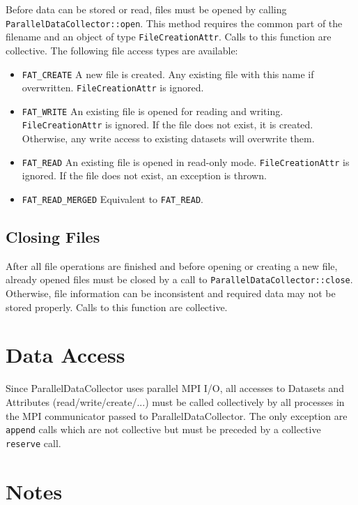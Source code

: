\documentclass[a4paper,10pt,BCOR12mm]{report}
\newcommand{\code}[1]{\small \texttt{#1}}
\begin{document}
Before data can be stored or read, files must be opened by calling \\
\code{ParallelDataCollector::open}. This method requires the common part of the filename
and an object of type \code{FileCreationAttr}.
Calls to this function are collective.
The following file access types are available:
\begin{itemize}
	\item \code{FAT\_CREATE}
	A new file is created. Any existing file with this name if overwritten.
	\code{FileCreationAttr} is ignored.

	\item \code{FAT\_WRITE}
	An existing file is opened for reading and writing.
	\code{FileCreationAttr} is ignored.
	If the file does not exist, it is created.
	Otherwise, any write access to existing datasets will overwrite them.

	\item \code{FAT\_READ}
	An existing file is opened in read-only mode.
	\code{FileCreationAttr} is ignored.
	If the file does not exist, an exception is thrown.

	\item \code{FAT\_READ\_MERGED}
	Equivalent to \code{FAT\_READ}.
\end{itemize}


\subsection{Closing Files}

After all file operations are finished and before opening or creating a new file,
already opened files must be closed by a call to \code{ParallelDataCollector::close}.
Otherwise, file information can be inconsistent and required data may not
be stored properly.
Calls to this function are collective.


\section{Data Access}

Since ParallelDataCollector uses parallel MPI I/O, all accesses to Datasets and Attributes (read/write/create/...)
must be called collectively by all processes in the MPI communicator passed to ParallelDataCollector.
The only exception are \code{append} calls which are not collective but must be preceded by a collective \code{reserve} call.


\section{Notes}
\end{document}
